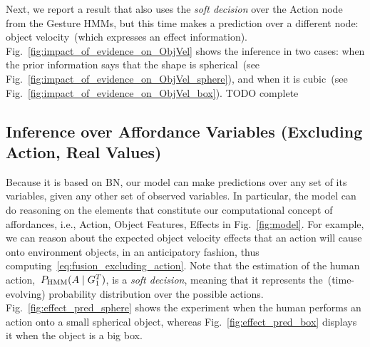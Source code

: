 \begin{figure*}
\centering
{} \quad
%
\caption{Predictions about the object velocity of different objects, when given probabilistic soft evidence about the action.}
\label{fig:impact_of_evidence_on_ObjVel}
\end{figure*}

Next, we report a result that also uses the \emph{soft decision} over the Action node from the Gesture \acp{HMM}, but this time makes a prediction over a different node: object velocity~(which expresses an effect information).
Fig.~\ref{fig:impact_of_evidence_on_ObjVel} shows the inference in two cases: when the prior information says that the shape is spherical~(see Fig.~\ref{fig:impact_of_evidence_on_ObjVel_sphere}), and when it is cubic~(see Fig.~\ref{fig:impact_of_evidence_on_ObjVel_box}).
TODO complete

\subsection{Inference over Affordance Variables (Excluding Action, Real Values)}

Because it is based on \ac{BN}, our model can make predictions over any set of its variables, given any other set of observed variables.
In particular, the model can do reasoning on the elements that constitute our computational concept of affordances, i.e., Action, Object Features, Effects in Fig.~\ref{fig:model}.
For example, we can reason about the expected object velocity effects that an action will cause onto environment objects, in an anticipatory fashion, thus computing~\eqref{eq:fusion_excluding_action}.
Note that the estimation of the human action,~$P_{\text{HMM}}(A \mid G_1^T)$, is a \emph{soft decision}, meaning that it represents the~(time-evolving) probability distribution over the possible actions.
Fig.~\ref{fig:effect_pred_sphere} shows the experiment when the human performs an action onto a small spherical object, whereas Fig.~\ref{fig:effect_pred_box} displays it when the object is a big box.

